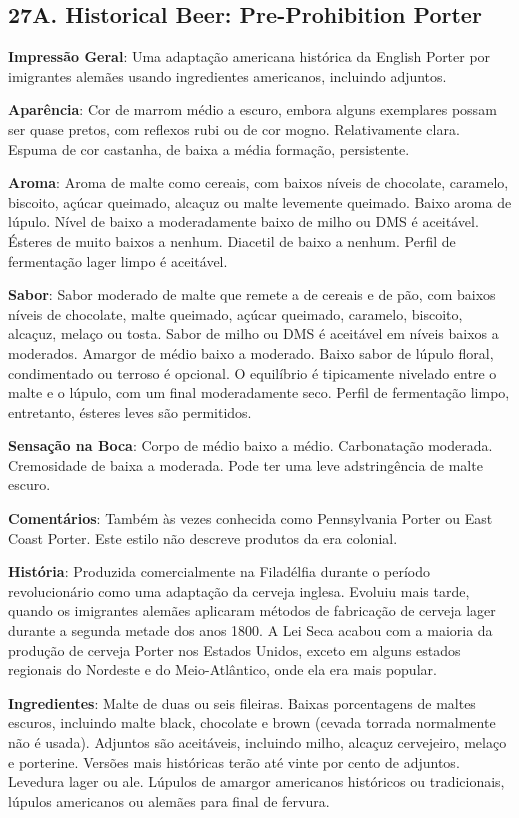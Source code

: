 \subsection*{27A. Historical Beer: Pre-Prohibition Porter}
\textbf{Impressão Geral}: Uma adaptação americana histórica da English Porter por imigrantes alemães usando ingredientes americanos, incluindo adjuntos.

\textbf{Aparência}: Cor de marrom médio a escuro, embora alguns exemplares possam ser quase pretos, com reflexos rubi ou de cor mogno. Relativamente clara. Espuma de cor castanha, de baixa a média formação, persistente.

\textbf{Aroma}: Aroma de malte como cereais, com baixos níveis de chocolate, caramelo, biscoito, açúcar queimado, alcaçuz ou malte levemente queimado. Baixo aroma de lúpulo. Nível de baixo a moderadamente baixo de milho ou DMS é aceitável. Ésteres de muito baixos a nenhum. Diacetil de baixo a nenhum. Perfil de fermentação lager limpo é aceitável.

\textbf{Sabor}: Sabor moderado de malte que remete a de cereais e de pão, com baixos níveis de chocolate, malte queimado, açúcar queimado, caramelo, biscoito, alcaçuz, melaço ou tosta. Sabor de milho ou DMS é aceitável em níveis baixos a moderados. Amargor de médio baixo a moderado. Baixo sabor de lúpulo floral, condimentado ou terroso é opcional. O equilíbrio é tipicamente nivelado entre o malte e o lúpulo, com um final moderadamente seco. Perfil de fermentação limpo, entretanto, ésteres leves são permitidos.

\textbf{Sensação na Boca}: Corpo de médio baixo a médio. Carbonatação moderada. Cremosidade de baixa a moderada. Pode ter uma leve adstringência de malte escuro.

\textbf{Comentários}: Também às vezes conhecida como Pennsylvania Porter ou East Coast Porter. Este estilo não descreve produtos da era colonial.

\textbf{História}: Produzida comercialmente na Filadélfia durante o período revolucionário como uma adaptação da cerveja inglesa. Evoluiu mais tarde, quando os imigrantes alemães aplicaram métodos de fabricação de cerveja lager durante a segunda metade dos anos 1800. A Lei Seca acabou com a maioria da produção de cerveja Porter nos Estados Unidos, exceto em alguns estados regionais do Nordeste e do Meio-Atlântico, onde ela era mais popular.

\textbf{Ingredientes}: Malte de duas ou seis fileiras. Baixas porcentagens de maltes escuros, incluindo malte black, chocolate e brown (cevada torrada normalmente não é usada). Adjuntos são aceitáveis, incluindo milho, alcaçuz cervejeiro, melaço e porterine. Versões mais históricas terão até vinte por cento de adjuntos. Levedura lager ou ale. Lúpulos de amargor americanos históricos ou tradicionais, lúpulos americanos ou alemães para final de fervura.


